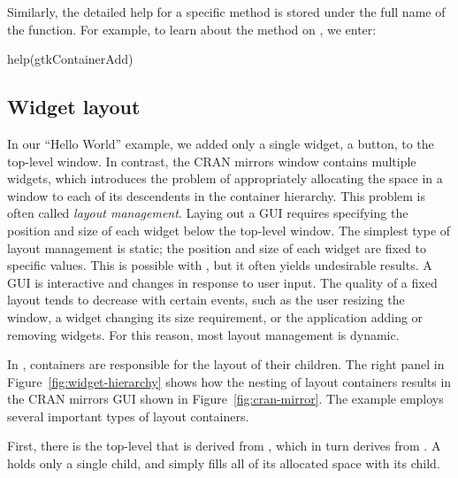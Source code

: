 \documentclass[article,shortnames]{jss}
\begin{document}
Similarly, the detailed help for a specific method is stored under the
full name of the function. For example, to learn about the 
method on , we enter:
\begin{Code}
help(gtkContainerAdd)
\end{Code}

\subsection{Widget layout}\label{sec:layout}


In our ``Hello World'' example, we added only a single widget, a
button, to the  top-level window. In contrast, the CRAN mirrors window
contains multiple widgets, which introduces the problem of
appropriately allocating the space in a window to each of its
descendents in the container hierarchy. This problem is often called
\emph{layout management}. Laying out a GUI requires specifying the
position and size of each widget below the top-level window. The
simplest type of layout management is static; the position and size of
each widget are fixed to specific values. This is possible
with , but it often yields undesirable results. A GUI is
interactive and changes in response to user input. The quality of a
fixed layout tends to decrease with certain events, such as the user
resizing the window, a widget changing its size requirement, or the
application adding or removing widgets. For this reason, most layout
management is dynamic.

In , containers are responsible for the layout of their
children. The right panel in Figure~\ref{fig:widget-hierarchy} shows
how the nesting of layout containers results in the CRAN mirrors GUI
shown in Figure~\ref{fig:cran-mirror}. The example employs several
important types of  layout containers. 

First, there is the
top-level  that is derived from , which
in turn derives from .  A  holds only
a single child, and  simply fills all of its allocated
space with its child. 
\end{document}
